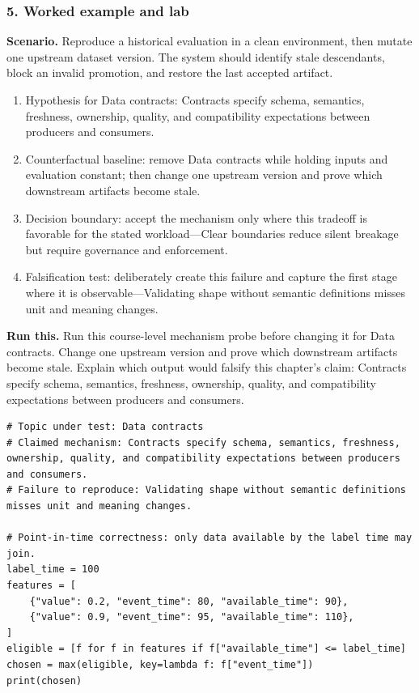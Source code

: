 \subsubsection*{5. Worked example and lab}
\textbf{Scenario.} Reproduce a historical evaluation in a clean environment, then mutate one upstream dataset version. The system should identify stale descendants, block an invalid promotion, and restore the last accepted artifact.
\begin{enumerate}
\item Hypothesis for Data contracts: Contracts specify schema, semantics, freshness, ownership, quality, and compatibility expectations between producers and consumers.
\item Counterfactual baseline: remove Data contracts while holding inputs and evaluation constant; then change one upstream version and prove which downstream artifacts become stale.
\item Decision boundary: accept the mechanism only where this tradeoff is favorable for the stated workload—Clear boundaries reduce silent breakage but require governance and enforcement.
\item Falsification test: deliberately create this failure and capture the first stage where it is observable—Validating shape without semantic definitions misses unit and meaning changes.
\end{enumerate}
\textbf{Run this.} Run this course-level mechanism probe before changing it for Data contracts. Change one upstream version and prove which downstream artifacts become stale. Explain which output would falsify this chapter's claim: Contracts specify schema, semantics, freshness, ownership, quality, and compatibility expectations between producers and consumers.
\begin{Verbatim}[fontsize=\scriptsize]
# Topic under test: Data contracts
# Claimed mechanism: Contracts specify schema, semantics, freshness, ownership, quality, and compatibility expectations between producers and consumers.
# Failure to reproduce: Validating shape without semantic definitions misses unit and meaning changes.

# Point-in-time correctness: only data available by the label time may join.
label_time = 100
features = [
    {"value": 0.2, "event_time": 80, "available_time": 90},
    {"value": 0.9, "event_time": 95, "available_time": 110},
]
eligible = [f for f in features if f["available_time"] <= label_time]
chosen = max(eligible, key=lambda f: f["event_time"])
print(chosen)
\end{Verbatim}

